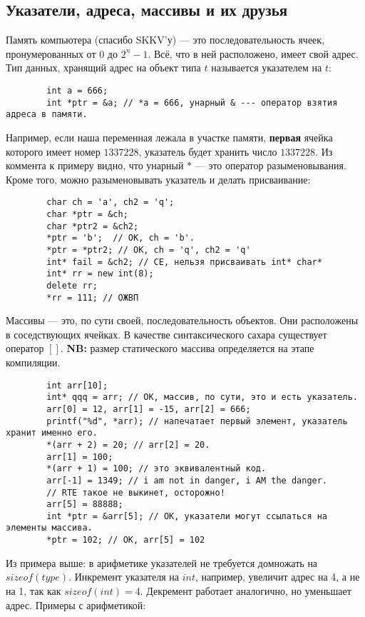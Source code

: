 \documentclass[15pt, a4paper]{article}
\newcommand{\nl}{\newline}
\begin{document}
    \subsection{Указатели, адреса, массивы и их друзья}
    Память компьютера (спасибо SKKV'у) --- это последовательность ячеек, пронумерованных от $0$ до $2^n-1$. Всё, что в ней расположено,
    имеет свой адрес. Тип данных, хранящий адрес на объект типа $t$ называется указателем на $t$:
    \begin{verbatim}
        int a = 666;
        int *ptr = &a; // *a = 666, унарный & --- оператор взятия адреса в памяти.      
    \end{verbatim} 
    Например, если наша переменная лежала в участке памяти, \textbf{первая} ячейка которого имеет номер $1337228$, указатель будет хранить число $1337228$.
    Из коммента к примеру видно, что унарный $*$ --- это оператор разыменовывания. Кроме того, можно разыменовывать указатель и делать присваивание:
    \begin{verbatim}
        char ch = 'a', ch2 = 'q';
        char *ptr = &ch;
        char *ptr2 = &ch2;
        *ptr = 'b';  // OK, ch = 'b'.
        *ptr = *ptr2; // OK, ch = 'q', ch2 = 'q'
        int* fail = &ch2; // CE, нельзя присваивать int* char*
        int* rr = new int(8);
        delete rr;
        *rr = 111; // ОЖВП
    \end{verbatim}
    Массивы --- это, по сути своей, последовательность объектов. Они расположены в соседствующих ячейках. В качестве синтаксического сахара существует оператор $[]$. \nl
    \textbf{NB:} размер статического массива определяется на этапе компиляции.
    \begin{verbatim}
        int arr[10];
        int* qqq = arr; // ОК, массив, по сути, это и есть указатель.
        arr[0] = 12, arr[1] = -15, arr[2] = 666;
        printf("%d", *arr); // напечатает первый элемент, указатель хранит именно его.
        *(arr + 2) = 20; // arr[2] = 20.
        arr[1] = 100;
        *(arr + 1) = 100; // это эквивалентный код. 
        arr[-1] = 1349; // i am not in danger, i AM the danger.
        // RTE такое не выкинет, осторожно!
        arr[5] = 88888;
        int *ptr = &arr[5]; // OK, указатели могут ссылаться на элементы массива.
        *ptr = 102; // OK, arr[5] = 102
    \end{verbatim}
    Из примера выше: в арифметике указателей не требуется домножать на $sizeof(type)$. Инкремент указателя на $int$, например, увеличит адрес
    на 4, а не на 1, так как $sizeof(int) = 4$. Декремент работает аналогично, но уменьшает адрес. Примеры с арифметикой: 
\end{document}
